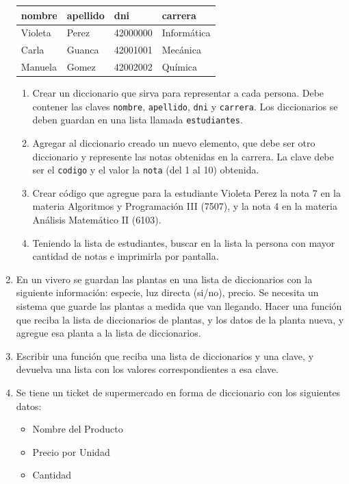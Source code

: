 \documentclass[
  letterpaper,
  DIV=11,
  numbers=noendperiod]{scrreprt}
\providecommand{\tightlist}{%
  \setlength{\itemsep}{0pt}\setlength{\parskip}{0pt}}\usepackage{longtable,booktabs,array}
\begin{document}
\begin{enumerate}
  \begin{longtable}[]{@{}llll@{}}
  \toprule\noalign{}
  nombre & apellido & dni & carrera \\
  \midrule\noalign{}
  \endhead
  \bottomrule\noalign{}
  \endlastfoot
  Violeta & Perez & 42000000 & Informática \\
  Carla & Guanca & 42001001 & Mecánica \\
  Manuela & Gomez & 42002002 & Química \\
  \end{longtable}

  \begin{enumerate}
  \def\labelenumii{\alph{enumii}.}
  \item
    Crear un diccionario que sirva para representar a cada persona. Debe
    contener las claves \texttt{nombre}, \texttt{apellido}, \texttt{dni}
    y \texttt{carrera}. Los diccionarios se deben guardan en una lista
    llamada \texttt{estudiantes}.
  \item
    Agregar al diccionario creado un nuevo elemento, que debe ser otro
    diccionario y represente las notas obtenidas en la carrera. La clave
    debe ser el \texttt{codigo} y el valor la \texttt{nota} (del 1 al
    10) obtenida.
  \item
    Crear código que agregue para la estudiante Violeta Perez la nota 7
    en la materia Algoritmos y Programación III (7507), y la nota 4 en
    la materia Análisis Matemático II (6103).
  \item
    Teniendo la lista de estudiantes, buscar en la lista la persona con
    mayor cantidad de notas e imprimirla por pantalla.
  \end{enumerate}
\item
  En un vivero se guardan las plantas en una lista de diccionarios con
  la siguiente información: especie, luz directa (si/no), precio. Se
  necesita un sistema que guarde las plantas a medida que van llegando.
  Hacer una función que reciba la lista de diccionarios de plantas, y
  los datos de la planta nueva, y agregue esa planta a la lista de
  diccionarios.
\item
  Escribir una función que reciba una lista de diccionarios y una clave,
  y devuelva una lista con los valores correspondientes a esa clave.
\item
  Se tiene un ticket de supermercado en forma de diccionario con los
  siguientes datos:

  \begin{itemize}
  \tightlist
  \item
    Nombre del Producto
  \item
    Precio por Unidad
  \item
    Cantidad
  \end{itemize}


\end{enumerate}
\end{document}
